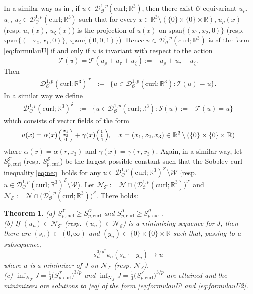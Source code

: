 \documentclass[12pt,leqno,twoside]{amsart}
\newtheorem{Th}{Theorem}[section]
\def\span{\mathrm{span}}
\def\R{\mathbb{R}}
\def\curl{\mathrm{curl}}
\def\W{\mathcal{W}}
\newcommand{\UU}{u}
\newcommand{\cD}{{\mathcal D}}
\newcommand{\cN}{{\mathcal N}}
\newcommand{\cO}{{\mathcal O}}
\newcommand{\cS}{{\mathcal S}}
\newcommand{\cT}{{\mathcal T}}
\def\Wco{\cD^{1,p}_{\cO}(\curl;\R^3)}
\numberwithin{equation}{section}
\begin{document}
In a similar way as in \cite[Section 2]{AzzBenDApFor}, if $u\in\Wco$, then there exist $\cO$-equivariant  $u_{\rho}$, $u_{\tau}$, $u_{\zeta}\in\Wco$ such that for every $x\in \R^3\setminus(\{0\}\times\{0\}\times\R)$,
$\UU_{\rho}(x)$ (resp. $\UU_{\tau}(x)$, $\UU_{\zeta}(x)$) is the projection of $\UU(x)$ on $\span \{(x_1,x_2,0)\}$ (resp. $\span\{(-x_2,x_1,0)\}$, $\span\{(0,0,1)\}$). 
Hence $u\in\Wco$  is of the form \eqref{eq:formulauU} if and only if $u$ is invariant with respect to the action
$$
\cT(\UU)=\cT(\UU_\rho+\UU_\tau+\UU_\zeta):=-\UU_\rho+\UU_\tau-\UU_\zeta.
$$
Then 
\begin{eqnarray*}
	\Wco^{\cT}&:=&\big\{u\in \Wco: \cT(u)=u\big\}.
\end{eqnarray*}
In a similar way we define 
\begin{eqnarray*}
	\Wco^{\cS}&:=&\big\{u\in \Wco: \cS(u):=-\cT(u)=u\big\}
\end{eqnarray*}
which consists of vector fields of the form 
\begin{equation}\label{eq:formulauU2}
u(x)=\alpha(x)\Bigl(\begin{smallmatrix}
x_1\\
x_2\\
0
\end{smallmatrix}\Bigr)+\gamma(x)\Bigl(\begin{smallmatrix}
0\\
0\\
1
\end{smallmatrix}\Bigr),\quad x=(x_1,x_2,x_3)\in\R^3\setminus(\{0\}\times\{0\}\times\R)
\end{equation}
where  $\alpha(x)=\alpha(r,x_3)$ and $\gamma(x)=\gamma(r,x_3)$. Again,  in a similar way, let $S_{p,\curl}^{\cT}$ (resp. $S_{p,\curl}^{\cS}$) be the largest possible constant such that the Sobolev-curl inequality \eqref{eq:neq} holds for any $u\in \Wco^{\cT}\setminus \W$ (resp. $u\in \Wco^{\cS}\setminus \W$).  Let $ \cN_\cT:=\cN\cap\big(\Wco\big)^{\cT}$ and $\cN_\cS:=\cN\cap\big(\Wco\big)^{\cS}$. There holds:

\begin{Th}\label{Th:main3}
	(a) $S_{p,\curl}^{\cT}\geq S_{p,\curl}^{\cO}$ and  $S_{p,\curl}^{\cS}\geq S_{p,\curl}^{\cO}$.\\
	(b)  If $(u_n)\subset \cN_\cT$ (resp. $(u_n)\subset \cN_\cS$) is a minimizing sequence for $J$, then there are $(s_n)\subset (0,\infty)$ and $(y_n)\subset \{0\}\times\{0\}\times\R$ such that, passing to a subsequence, 
	$$
	s_n^{3/p^*}u_n(s_n\cdot+y_n)\to u
	$$ 
	where $u$ is a minimizer of $J$ on $\cN_\cT$  (resp. $\cN_\cS$).\\
	(c) $\inf_{\cN_\cT}J=\frac13\big(S_{p,\curl}^{\cT}\big)^{3/p}$ and $\inf_{\cN_\cS}J=\frac13\big(S_{p,\curl}^{\cS}\big)^{3/p}$ are attained  and the minimizers are solutions  to \eqref{eq} of the form \eqref{eq:formulauU} and  \eqref{eq:formulauU2}.
\end{Th}
\end{document}
